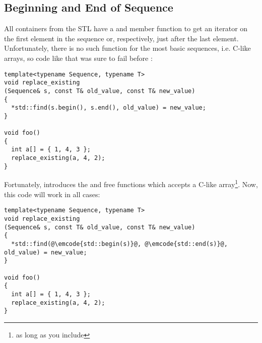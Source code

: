 \subsection{Beginning and End of Sequence}

All containers from the STL have a  and 
member function to get an iterator on the first element in the
sequence or, respectively, just after the last element. Unfortunately,
there is no such function for the most basic sequences, i.e. C-like
arrays, so code like that was sure to fail before :

\begin{lstlisting}
template<typename Sequence, typename T>
void replace_existing
(Sequence& s, const T& old_value, const T& new_value)
{
  *std::find(s.begin(), s.end(), old_value) = new_value;
}

void foo()
{
  int a[] = { 1, 4, 3 };
  replace_existing(a, 4, 2);
}
\end{lstlisting}

Fortunately,  introduces the  and
 free functions which accepts a C-like
array\footnote{as long as you include
  }. Now, this code will work in
all cases:

\begin{lstlisting}
template<typename Sequence, typename T>
void replace_existing
(Sequence& s, const T& old_value, const T& new_value)
{
  *std::find(@\emcode{std::begin(s)}@, @\emcode{std::end(s)}@, old_value) = new_value;
}

void foo()
{
  int a[] = { 1, 4, 3 };
  replace_existing(a, 4, 2);
}
\end{lstlisting}

